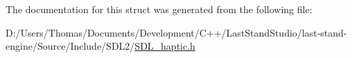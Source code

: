The documentation for this struct was generated from the following file\+:\begin{DoxyCompactItemize}
\item 
D\+:/\+Users/\+Thomas/\+Documents/\+Development/\+C++/\+Last\+Stand\+Studio/last-\/stand-\/engine/\+Source/\+Include/\+S\+D\+L2/\hyperlink{SDL__haptic_8h}{S\+D\+L\+\_\+haptic.\+h}\end{DoxyCompactItemize}
